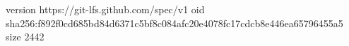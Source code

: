 version https://git-lfs.github.com/spec/v1
oid sha256:f892f0cd685bd84d6371c5bf8c084afc20e4078fc17cdcb8e446ea65796455a5
size 2442
